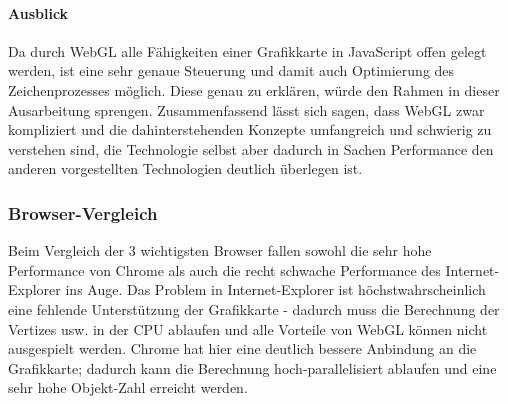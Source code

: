 \documentclass[a4paper, 12pt]{article}
\begin{document}
\paragraph{Ausblick} Da durch WebGL alle Fähigkeiten einer Grafikkarte in JavaScript offen gelegt werden, ist eine sehr genaue Steuerung und damit auch Optimierung des Zeichenprozesses möglich. Diese genau zu erklären, würde den Rahmen in dieser Ausarbeitung sprengen. Zusammenfassend lässt sich sagen, dass WebGL zwar kompliziert und die dahinterstehenden Konzepte umfangreich und schwierig zu verstehen sind, die Technologie selbst aber dadurch in Sachen Performance den anderen vorgestellten Technologien deutlich überlegen ist. 
\newpage
\subsubsection{Browser-Vergleich} Beim Vergleich der 3 wichtigsten Browser fallen sowohl die sehr hohe Performance von Chrome als auch die recht schwache Performance des Internet-Explorer ins Auge. Das Problem in Internet-Explorer ist höchstwahrscheinlich eine fehlende Unterstützung der Grafikkarte - dadurch muss die Berechnung der Vertizes usw. in der CPU ablaufen und alle Vorteile von WebGL können nicht ausgespielt werden. Chrome hat hier eine deutlich bessere Anbindung an die Grafikkarte; dadurch kann die Berechnung hoch-parallelisiert ablaufen und eine sehr hohe Objekt-Zahl erreicht werden.
\end{document}
